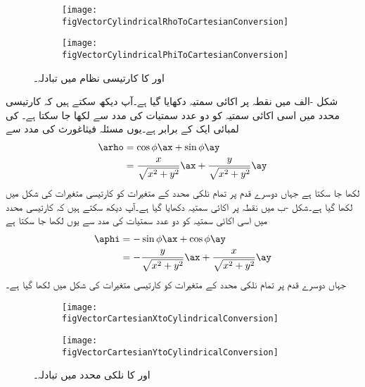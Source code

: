 %
\begin{figure}
\centering
\begin{subfigure}{0.5\textwidth}
\centering
\texttt{[image: figVectorCylindricalRhoToCartesianConversion]}
\end{subfigure}%
%
\begin{subfigure}{0.5\textwidth}
\centering
\texttt{[image: figVectorCylindricalPhiToCartesianConversion]}
\end{subfigure}%
\caption{ اور  کا کارتیسی نظام میں تبادلہ۔}
\label{شکل_سمتیہ_کارتیسی_نظام_میں_نلکی_رداس_اکائی}
\end{figure}%

شکل -الف میں نقطہ  پر اکائی سمتیہ  دکھایا گیا ہے۔آپ دیکھ سکتے ہیں کہ کارتیسی محدد میں اسی اکائی سمتیہ کو دو عدد سمتیات کی مدد سے لکھا جا سکتا ہے۔ کی لمبائی ایک کے برابر ہے۔یوں مسئلہ فیثاغورث کی مدد سے
\begin{gather}
\begin{aligned}\label{مساوات_سمتیہ_اکائی_رداس_کارتیسی_میں}
\arho&=\cos \phi \ax+\sin \phi \ay\\
&=\frac{x}{\sqrt{x^2+y^2}} \ax+\frac{y}{\sqrt{x^2+y^2}} \ay
\end{aligned}
\end{gather}
 لکھا جا سکتا ہے جہاں دوسرے قدم پر تمام نلکی محدد کے متغیرات کو کارتیسی متغیرات کی شکل میں لکھا گیا ہے۔شکل -ب میں نقطہ  پر اکائی سمتیہ  دکھایا گیا ہے۔آپ دیکھ سکتے ہیں کہ کارتیسی محدد میں اسی اکائی سمتیہ کو دو عدد سمتیات کی مدد سے یوں  لکھا جا سکتا ہے
\begin{gather}
\begin{aligned}\label{مساوات_سمتیہ_اکائی_زاویہ_کارتیسی_میں}
\aphi&=-\sin \phi \ax+\cos \phi \ay\\
&=-\frac{y}{\sqrt{x^2+y^2}} \ax+\frac{x}{\sqrt{x^2+y^2}} \ay
\end{aligned}
\end{gather}
جہاں دوسرے قدم پر تمام نلکی محدد کے متغیرات کو کارتیسی متغیرات کی شکل میں لکھا گیا ہے۔
%
\begin{figure}
\centering
\begin{subfigure}{0.5\textwidth}
\centering
\texttt{[image: figVectorCartesianXtoCylindricalConversion]}
\end{subfigure}%
%
\begin{subfigure}{0.5\textwidth}
\centering
\texttt{[image: figVectorCartesianYtoCylindricalConversion]}
\end{subfigure}%
\caption{ اور  کا نلکی محدد میں تبادلہ۔}
\label{شکل_سمتیہ_نلکی_محدد_میں_کارتیسی_اکائی_سمتیات}
\end{figure}%

